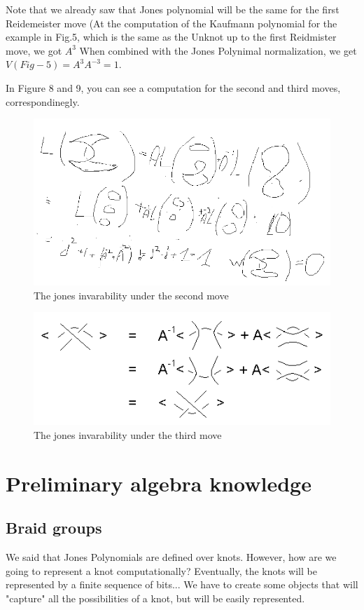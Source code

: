 \documentclass{article}
\begin{document}
Note that we already saw that Jones polynomial will be the same for the first Reidemeister move (At the computation of the Kaufmann polynomial for the example in Fig.5, which is the same as the Unknot up to the first Reidmister move, we got $A^{3}$ When combined with the Jones Polynimal normalization, we get $V(Fig-5)=A^{3}A^{-3} = 1$.

In Figure 8 and 9, you can see a computation for the second and third moves, correspondinegly.

\begin{figure}
\includegraphics[scale=0.5]{second_rule} 
\caption{The jones invarability under the second move}
\end{figure}

\begin{figure}
\includegraphics[scale=0.5]{thirdRule} 
\caption{The jones invarability under the third move}
\end{figure}


\section{Preliminary algebra knowledge}

\subsection{Braid groups}
We said that Jones Polynomials are defined over knots. However, how are we going to represent a knot computationally?
Eventually, the knots will be represented by a finite sequence of bits... 
We have to create some objects that will "capture" all the possibilities of a knot, but will be easily represented.
\end{document}
